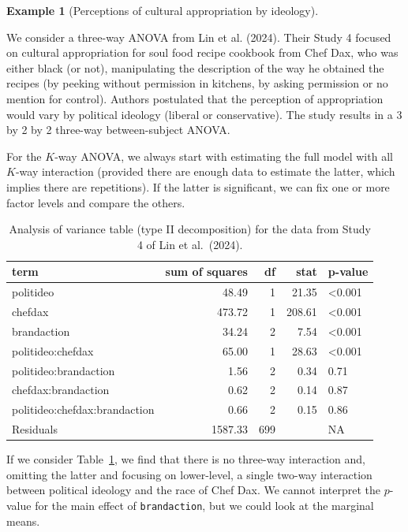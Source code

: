 \documentclass[
  11pt,
  letterpaper,
]{scrbook}
\theoremstyle{definition}
\theoremstyle{definition}
\newtheorem{example}{Example}[chapter]
\theoremstyle{remark}
\begin{document}
\begin{example}[Perceptions of cultural appropriation by
ideology]\protect\hypertarget{exm-LKUK24}{}\label{exm-LKUK24}

We consider a three-way ANOVA from Lin et al. (2024). Their Study 4
focused on cultural appropriation for soul food recipe cookbook from
Chef Dax, who was either black (or not), manipulating the description of
the way he obtained the recipes (by peeking without permission in
kitchens, by asking permission or no mention for control). Authors
postulated that the perception of appropriation would vary by political
ideology (liberal or conservative). The study results in a 3 by 2 by 2
three-way between-subject ANOVA.

For the \(K\)-way ANOVA, we always start with estimating the full model
with all \(K\)-way interaction (provided there are enough data to
estimate the latter, which implies there are repetitions). If the latter
is significant, we can fix one or more factor levels and compare the
others.

\begin{longtable}[]{@{}lrrrl@{}}

\caption{\label{tbl-anova-LKUK24}Analysis of variance table (type II
decomposition) for the data from Study 4 of Lin et al.~(2024).}

\tabularnewline

\toprule\noalign{}
term & sum of squares & df & stat & p-value \\
\midrule\noalign{}
\endhead
\bottomrule\noalign{}
\endlastfoot
politideo & 48.49 & 1 & 21.35 & \textless0.001 \\
chefdax & 473.72 & 1 & 208.61 & \textless0.001 \\
brandaction & 34.24 & 2 & 7.54 & \textless0.001 \\
politideo:chefdax & 65.00 & 1 & 28.63 & \textless0.001 \\
politideo:brandaction & 1.56 & 2 & 0.34 & 0.71 \\
chefdax:brandaction & 0.62 & 2 & 0.14 & 0.87 \\
politideo:chefdax:brandaction & 0.66 & 2 & 0.15 & 0.86 \\
Residuals & 1587.33 & 699 & & NA \\

\end{longtable}

If we consider Table~\ref{tbl-anova-LKUK24}, we find that there is no
three-way interaction and, omitting the latter and focusing on
lower-level, a single two-way interaction between political ideology and
the race of Chef Dax. We cannot interpret the \(p\)-value for the main
effect of \texttt{brandaction}, but we could look at the marginal means.


\end{example}
\end{document}

